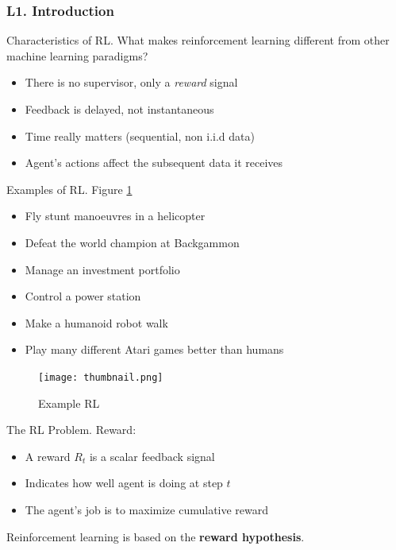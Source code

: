 \documentclass[english]{article}
\begin{document}
\subsubsection{L1. Introduction}
\benum 

\item {Characteristics of RL}.
What makes reinforcement learning different from other machine
learning paradigms?
\begin{itemize}
    \item There is no supervisor, only a \textit{reward} signal
    \item Feedback is delayed, not instantaneous
    \item Time really matters (sequential, non i.i.d data)
    \item Agent's actions affect the subsequent data it receives
\end{itemize}



\item {Examples of RL}. Figure \ref{Example RL}
\begin{itemize}
    \item Fly stunt manoeuvres in a helicopter
    \item Defeat the world champion at Backgammon
    \item Manage an investment portfolio
    \item Control a power station
    \item Make a humanoid robot walk
    \item Play many different Atari games better than humans
\end{itemize}

    \begin{figure}
        \centering
        \texttt{[image: thumbnail.png]}
        \caption{Example RL}
        \label{Example RL}
    \end{figure}

\item {The RL Problem}. 
 {Reward}: 
\begin{itemize}
    \item A reward $R_t$ is a scalar feedback signal
    \item Indicates how well agent is doing at step $t$
    \item The agent's job is to maximize cumulative reward
\end{itemize}
Reinforcement learning is based on the \textbf{reward hypothesis}.
 
\end{document}
